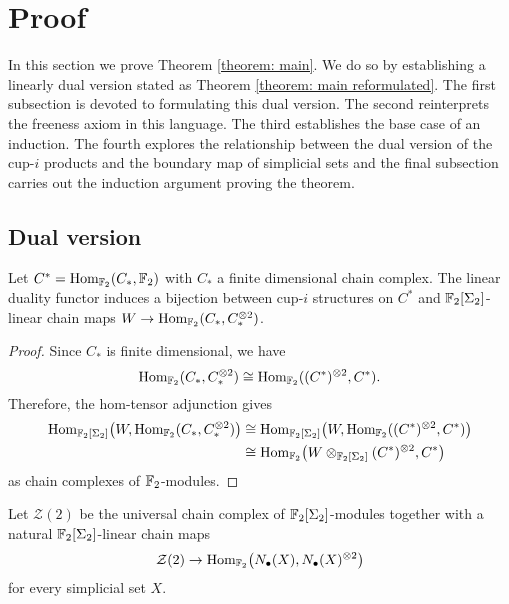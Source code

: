 
\section{Proof} \label{sec: proof}

In this section we prove Theorem \ref{theorem: main}. We do so by establishing a linearly dual version stated as Theorem \ref{theorem: main reformulated}. The first subsection is devoted to formulating this dual version. The second reinterprets the freeness axiom in this language. The third establishes the base case of an induction. The fourth explores the relationship between the dual version of the cup-$i$ products and the boundary map of simplicial sets and the final subsection carries out the induction argument proving the theorem.

\subsection{Dual version}

\begin{lemma} \label{lemma: cup-i constructions and diagonals are the same}
	Let $C^* = \mathrm{Hom}_{\mathbb{F}_2}(C_*, \mathbb{F}_2)$ with $C_*$ a finite dimensional chain complex. The linear duality functor induces a bijection between cup-$i$ structures on $C^*$ and $\mathbb{F}_2[\Sigma_2]$-linear chain maps $W \to \mathrm{Hom}_{\mathbb{F}_2}(C_*, C_*^{\otimes 2})$.
\end{lemma}

\begin{proof}
    Since $C_\ast$ is finite dimensional, we have
    \[
    \mathrm{Hom}_{\mathbb{F}_2}(C_\ast, C_\ast^{\otimes 2}) \cong \mathrm{Hom}_{\mathbb{F}_2}((C^\ast)^{\otimes 2}, C^\ast).
    \]
    Therefore, the hom-tensor adjunction gives
    \begin{align*}
    \mathrm{Hom}_{\mathbb{F}_2[\Sigma_2]}\big(W, \mathrm{Hom}_{\mathbb{F}_2}(C_\ast, C_\ast^{\otimes 2}) \big) & \cong
    \mathrm{Hom}_{\mathbb{F}_2[\Sigma_2]}\big(W, \mathrm{Hom}_{\mathbb{F}_2}((C^\ast)^{\otimes 2}, C^\ast) \big) \\ & \cong
    \mathrm{Hom}_{\mathbb{F}_2} \big(W \otimes_{\mathbb{F}_2[\Sigma_2]} (C^\ast)^{\otimes 2}, C^\ast \big)
    \end{align*}
    as chain complexes of $\mathbb{F}_2$-modules.
\end{proof}

\begin{definition}
	Let $\mathcal Z(2)$ be the universal chain complex of $\mathbb{F}_2[\Sigma_2]$-modules together with a natural $\mathbb{F}_2[\Sigma_2]$-linear chain maps
	\[
	\mathcal Z(2) \to \mathrm{Hom}_{\mathbb{F}_2}\big( N_\bullet(X), N_\bullet(X)^{\otimes 2} \big)
	\]
	for every simplicial set $X$.
\end{definition}

